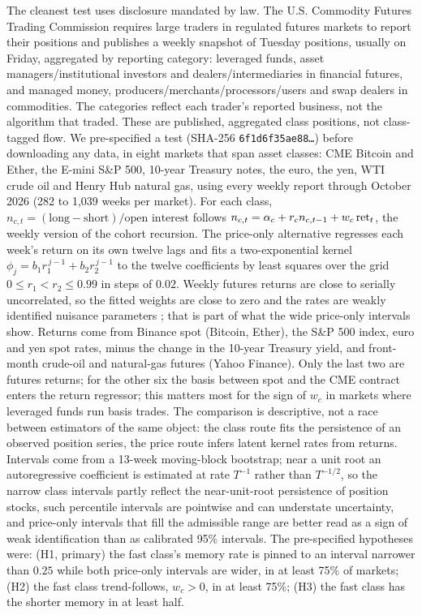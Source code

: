 \documentclass[12pt]{article}
\theoremstyle{definition}
\theoremstyle{remark}
\begin{document}
The cleanest test uses disclosure mandated by law. The U.S. Commodity Futures Trading Commission requires large traders in regulated futures markets to report their positions and publishes a weekly snapshot of Tuesday positions, usually on Friday, aggregated by reporting category: leveraged funds, asset managers/institutional investors and dealers/intermediaries in financial futures, and managed money, producers/merchants/processors/users and swap dealers in commodities. The categories reflect each trader's reported business, not the algorithm that traded. These are published, aggregated class positions, not class-tagged flow. We pre-specified a test (SHA-256 \texttt{6f1d6f35ae88\ldots}) before downloading any data, in eight markets that span asset classes: CME Bitcoin and Ether, the E-mini S\&P 500, 10-year Treasury notes, the euro, the yen, WTI crude oil and Henry Hub natural gas, using every weekly report through October 2026 (282 to 1{,}039 weeks per market). For each class, $n_{c,t}=(\text{long}-\text{short})/\text{open interest}$ follows $n_{c,t}=\alpha_c+r_cn_{c,t-1}+w_c\,{\rm ret}_t$, the weekly version of the cohort recursion. The price-only alternative regresses each week's return on its own twelve lags and fits a two-exponential kernel $\phi_j=b_1r_1^{\,j-1}+b_2r_2^{\,j-1}$ to the twelve coefficients by least squares over the grid $0\le r_1<r_2\le0.99$ in steps of $0.02$. Weekly futures returns are close to serially uncorrelated, so the fitted weights are close to zero and the rates are weakly identified nuisance parameters \citep{andrews2012}; that is part of what the wide price-only intervals show. Returns come from Binance spot (Bitcoin, Ether), the S\&P 500 index, euro and yen spot rates, minus the change in the 10-year Treasury yield, and front-month crude-oil and natural-gas futures (Yahoo Finance). Only the last two are futures returns; for the other six the basis between spot and the CME contract enters the return regressor; this matters most for the sign of $w_c$ in markets where leveraged funds run basis trades. The comparison is descriptive, not a race between estimators of the same object: the class route fits the persistence of an observed position series, the price route infers latent kernel rates from returns. Intervals come from a 13-week moving-block bootstrap; near a unit root an autoregressive coefficient is estimated at rate $T^{-1}$ rather than $T^{-1/2}$, so the narrow class intervals partly reflect the near-unit-root persistence of position stocks, such percentile intervals are pointwise and can understate uncertainty, and price-only intervals that fill the admissible range are better read as a sign of weak identification than as calibrated 95\% intervals. The pre-specified hypotheses were: (H1, primary) the fast class's memory rate is pinned to an interval narrower than $0.25$ while both price-only intervals are wider, in at least 75\% of markets; (H2) the fast class trend-follows, $w_c>0$, in at least 75\%; (H3) the fast class has the shorter memory in at least half.
\end{document}
